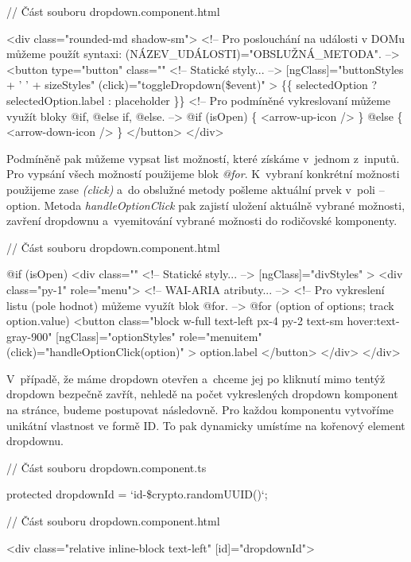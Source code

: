 \begin{prog}
// Část souboru dropdown.component.html

<div class="rounded-md shadow-sm">
  <!-- Pro poslouchání na události v DOMu můžeme 
    použít syntaxi: (NÁZEV_UDÁLOSTI)="OBSLUŽNÁ_METODA". -->
  <button
    type="button"
    class="" <!-- Statické styly... -->
    [ngClass]="buttonStyles + ' ' + sizeStyles"
    (click)="toggleDropdown(\$event)"
  >
    \{\{ selectedOption ? selectedOption.label : placeholder \}\}
    <!-- Pro podmíněné vykreslovaní můžeme využít bloky @if, @else if, @else. -->
    @if (isOpen) \{
      <arrow-up-icon />
    \} @else \{
      <arrow-down-icon />
    \}
  </button>
</div>
\end{prog}

Podmíněně pak můžeme vypsat list možností, které získáme v~jednom z~inputů. Pro vypsání všech možností použijeme blok \emph{@for}. 
K~vybraní konkrétní možnosti použijeme zase \emph{(click)} a~do obslužné metody pošleme aktuální prvek v~poli -- option. 
Metoda \emph{handleOptionClick} pak zajistí uložení aktuálně vybrané možnosti, zavření dropdownu a~vyemitování vybrané možnosti do rodičovské komponenty.

\begin{prog}
// Část souboru dropdown.component.html

@if (isOpen) {
  <div
    class="" <!-- Statické styly... -->
    [ngClass]="divStyles"
  >
    <div class="py-1" role="menu"> <!-- WAI-ARIA atributy... -->
      <!-- Pro vykreslení listu (pole hodnot) můžeme využít blok @for. -->
      @for (option of options; track option.value) {
        <button
          class="block w-full text-left px-4 py-2 text-sm hover:text-gray-900"
          [ngClass]="optionStyles"
          role="menuitem"
          (click)="handleOptionClick(option)"
        >
          {{ option.label }}
        </button>
      }
    </div>
  </div>
}
\end{prog}

V~případě, že máme dropdown otevřen a~chceme jej po kliknutí mimo tentýž dropdown bezpečně zavřít, nehledě na počet vykreslených dropdown komponent na stránce, budeme postupovat následovně. 
Pro každou komponentu vytvoříme unikátní vlastnost ve formě ID. To pak dynamicky umístíme na kořenový element dropdownu.

\begin{prog}
// Část souboru dropdown.component.ts

protected dropdownId = `id-\${crypto.randomUUID()}`;

// Část souboru dropdown.component.html

<div class="relative inline-block text-left" [id]="dropdownId">
\end{prog}

